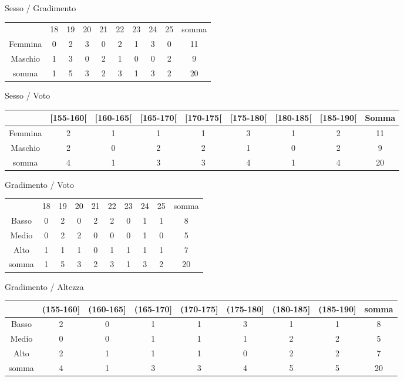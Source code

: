 \begin{center}
Sesso / Gradimento\\
\begin{tabular}{ccccccccc|c}
\hline
        & 18 &  19 &  20 &  21 &   22 &  23 &  24 &  25 &  somma\\ 
Femmina &  0 &   2 &   3 &   0 &    2 &   1 &   3 &   0 &  11\\
Maschio &  1 &   3 &   0 &   2 &    1 &   0 &   0 &   2 &   9\\
\hline
somma   &  1 &   5 &   3 &   2 &    3 &   1 &   3 &   2 &  20\\
\end{tabular}

\vspace{1em}
Sesso / Voto\\
\begin{tabular}{cccccccc|c} 
        \hline
&{\scriptsize [155-160[} & {\scriptsize [160-165[}
&{\scriptsize [165-170[} & {\scriptsize [170-175[}
&{\scriptsize [175-180[} & {\scriptsize [180-185[}
&{\scriptsize [185-190[} & {\scriptsize Somma}\\ 
\hline 
Femmina &  2&  1&  1&  1&  3&  1&  2&  11\\
Maschio &  2&  0&  2&  2&  1&  0&  2&   9\\
\hline
somma   &  4&  1&  3&  3&  4&  1&  4&  20\\
\end{tabular}

\vspace{1em}
Gradimento / Voto\\ 
\begin{tabular}{ccccccccc|c}
        \hline
      &  18 &  19 &  20 &  21 &  22 &  23 &  24 &  25 & somma\\ 
Basso &   0 &   2 &   0 &   2 &   2 &   0 &   1 &   1 &   8\\
Medio &   0 &   2 &   2 &   0 &   0 &   0 &   1 &   0 &   5\\
Alto  &   1 &   1 &   1 &   0 &   1 &   1 &   1 &   1 &   7\\
\hline
somma &   1 &   5 &   3 &   2 &   3 &   1 &   3 &   2 &  20\\
\end{tabular}

\vspace{1em}
Gradimento / Altezza\\
\begin{tabular}{cccccccc|c}
        \hline
&{\scriptsize (155-160]} & {\scriptsize (160-165]}
&{\scriptsize (165-170]} & {\scriptsize (170-175]}
&{\scriptsize (175-180]} & {\scriptsize (180-185]}
&{\scriptsize (185-190]} & {\scriptsize somma}\\  
\hline
Basso &  2 &  0 &  1 &  1 &  3 &  1 &  1 &   8\\
Medio &  0 &  0 &  1 &  1 &  1 &  2 &  2 &   5\\
Alto  &  2 &  1 &  1 &  1 &  0 &  2 &  2 &   7\\
\hline
somma &  4 &  1 &  3 &  3 &  4 &  5 &  5 &  20\\
\end{tabular}


\end{center}
